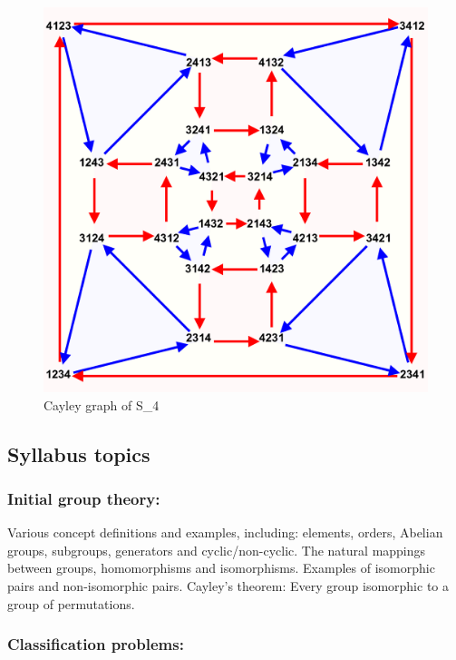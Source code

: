 \begin{figure}[htbp]
\centering
\includegraphics{./S4_Cayley.png}
\caption{Cayley graph of S\_4}
\end{figure}

\subsection{Syllabus topics}\label{syllabus-topics-1}

\subsubsection{Initial group theory:}\label{initial-group-theory}

Various concept definitions and examples, including: elements, orders,
Abelian groups, subgroups, generators and cyclic/non-cyclic. The natural
mappings between groups, homomorphisms and isomorphisms. Examples of
isomorphic pairs and non-isomorphic pairs. Cayley's theorem: Every group
isomorphic to a group of permutations.

\subsubsection{Classification problems:}\label{classification-problems}


